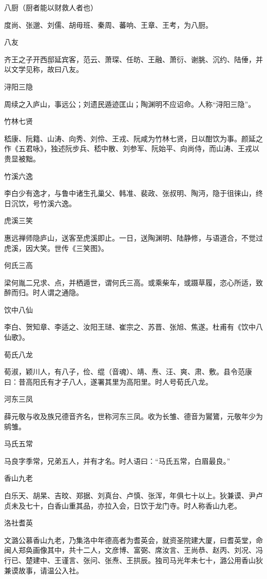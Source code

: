 \documentclass[a4paper,12pt,UTF8,twoside]{ctexbook}
\begin{document}
    八厨（厨者能以财救人者也）
    
    度尚、张邈、刘儒、胡毋班、秦周、蕃响、王章、王考，为八厨。
    
    八友
    
    齐王之子开西邸延宾客，范云、萧琛、任昉、王融、萧衍、谢朓、沉约、陆倕，并以文学见称，故曰八友。
    
    浔阳三隐
    
    周续之入庐山，事远公；刘遗民遁迹匡山；陶渊明不应诏命。人称“浔阳三隐”。
    
    竹林七贤
    
    嵇康、阮籍、山涛、向秀、刘伶、王戎、阮咸为竹林七贤，日以酣饮为事。颜延之作《五君咏》，独述阮步兵、嵇中散、刘参军、阮始平、向尚侍，而山涛、王戎以贵显被黜。
    
    竹溪六逸
    
    李白少有逸才，与鲁中诸生孔巢父、韩准、裴政、张叔明、陶沔，隐于徂徕山，终日沉饮，号竹溪六逸。
    
    虎溪三笑
    
    惠远禅师隐庐山，送客至虎溪即止。一日，送陶渊明、陆静修，与语道合，不觉过虎溪，因大笑。世传《三笑图》。
    
    何氏三高
    
    梁何胤二兄求、点，并栖遁世，谓何氏三高。或乘柴车，或蹑草履，恣心所适，致醉而归。时人谓之通隐。
    
    饮中八仙
    
    李白、贺知章、李适之、汝阳王琎、崔宗之、苏晋、张旭、焦遂。杜甫有《饮中八仙歌》。
    
    荀氏八龙
    
    荀淑，颖川人，有八子，俭、绲（音魂）、靖、焘、汪、爽、肃、敷。县令范康曰：昔高阳氏有才子八人，遂署其里为高阳里。时人号荀氏八龙。
    
    河东三凤
    
    薛元敬与收及族兄德音齐名，世称河东三凤。收为长雏、德音为鸑鷟，元敬年少为鹓雏。
    
    马氏五常
    
    马良字季常，兄弟五人，并有才名。时人语曰：“马氏五常，白眉最良。”
    
    香山九老
    
    白乐天、胡杲、吉旼、郑据、刘真台、卢慎、张浑，年俱七十以上。狄兼谟、尹卢贞未及七十，白香山重其品，亦拉入会，日饮于龙门寺。时人称香山九老。
    
    洛社耆英
    
    文潞公慕香山九老，乃集洛中年德高者为耆英会，就资圣院建大厦，曰耆英堂，命闽人郑奂画像其中，共十二人，文彦博、富弼、席汝言、王尚恭、赵丙、刘况、冯行已、楚建中、王谨言、张问、张焘、王拱辰。独司马光年未七十，潞公用香山狄兼谟故事，请温公入社。
    
\end{document}
